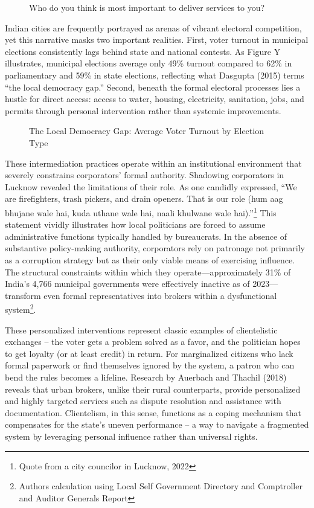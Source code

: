 \begin{figure}[htbp]
\centering
\caption{Who do you think is most important to deliver services to you?}
\label{fig:service_delivery}
\end{figure}

Indian cities are frequently portrayed as arenas of vibrant electoral competition, yet this narrative masks two important realities. First, voter turnout in municipal elections consistently lags behind state and national contests. As Figure Y illustrates, municipal elections average only 49\% turnout compared to 62\% in parliamentary and 59\% in state elections, reflecting what Dasgupta (2015) terms ``the local democracy gap.'' Second, beneath the formal electoral processes lies a hustle for direct access: access to water, housing, electricity, sanitation, jobs, and permits through personal intervention rather than systemic improvements.

\begin{figure}[htbp]
\centering
\caption{The Local Democracy Gap: Average Voter Turnout by Election Type}
\label{fig:voter_turnout}
\end{figure}

These intermediation practices operate within an institutional environment that severely constrains corporators' formal authority. Shadowing corporators in Lucknow revealed the limitations of their role. As one candidly expressed, ``We are firefighters, trash pickers, and drain openers. That is our role (hum aag bhujane wale hai, kuda uthane wale hai, naali khulwane wale hai).''\footnote{Quote from a city councilor in Lucknow, 2022} This statement vividly illustrates how local politicians are forced to assume administrative functions typically handled by bureaucrats. In the absence of substantive policy-making authority, corporators rely on patronage not primarily as a corruption strategy but as their only viable means of exercising influence. The structural constraints within which they operate—approximately 31\% of India's 4,766 municipal governments were effectively inactive as of 2023—transform even formal representatives into brokers within a dysfunctional system\footnote{Authors calculation using Local Self Government Directory and Comptroller and Auditor Generals Report}.

These personalized interventions represent classic examples of clientelistic exchanges – the voter gets a problem solved as a favor, and the politician hopes to get loyalty (or at least credit) in return. For marginalized citizens who lack formal paperwork or find themselves ignored by the system, a patron who can bend the rules becomes a lifeline. Research by Auerbach and Thachil (2018) reveals that urban brokers, unlike their rural counterparts, provide personalized and highly targeted services such as dispute resolution and assistance with documentation. Clientelism, in this sense, functions as a coping mechanism that compensates for the state's uneven performance – a way to navigate a fragmented system by leveraging personal influence rather than universal rights.

